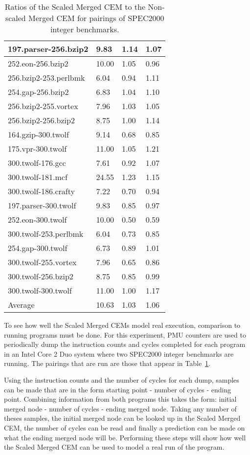 \begin{table}
\begin{tabular}{|l|l|l|l|}
197.parser-256.bzip2&9.83&1.14&1.07\\
\hline
252.eon-256.bzip2&10.00&1.05&0.96\\
\hline
256.bzip2-253.perlbmk&6.04&0.94&1.11\\
\hline
254.gap-256.bzip2&6.83&1.04&1.10\\
\hline
256.bzip2-255.vortex&7.96&1.03&1.05\\
\hline
256.bzip2-256.bzip2&8.75&1.00&1.14\\
\hline
164.gzip-300.twolf&9.14&0.68&0.85\\
\hline
175.vpr-300.twolf&11.00&1.05&1.21\\
\hline
300.twolf-176.gcc&7.61&0.92&1.07\\
\hline
300.twolf-181.mcf&24.55&1.23&1.15\\
\hline
300.twolf-186.crafty&7.22&0.70&0.94\\
\hline
197.parser-300.twolf&9.83&0.85&0.97\\
\hline
252.eon-300.twolf&10.00&0.50&0.59\\
\hline
300.twolf-253.perlbmk&6.04&0.73&0.85\\
\hline
254.gap-300.twolf&6.73&0.89&1.01\\
\hline
300.twolf-255.vortex&7.96&0.65&0.86\\
\hline
300.twolf-256.bzip2&8.75&0.85&0.99\\
\hline
300.twolf-300.twolf&11.00&1.00&1.17\\
\hline
\hline
Average&10.63&1.03&1.06\\
\hline
\end{tabular}
\caption{Ratios of the Scaled Merged CEM to the Non-scaled Merged CEM for pairings of SPEC2000
integer benchmarks.}
\label{table:scaled_graph_complexity}
\end{table}


To see how well the Scaled Merged CEMs model real execution,
comparison to running programs must be done. For this
experiment, PMU counters are used to periodically dump the
instruction counts and cycles completed for each program in an Intel Core 2 Duo
system where two SPEC2000 integer benchmarks are running.
The pairings that are run are those
that appear in Table~\ref{table:scaled_graph_complexity}.

Using the instruction counts and the number of cycles for each dump,
samples can be made that are in the form starting point - number of
cycles - ending point.  Combining information from both programs this
takes the form: initial merged node - number of cycles - ending merged
node. Taking any number of theses samples, the initial merged node can
be looked up in the Scaled Merged CEM, the number of cycles can be read and
finally a prediction can be made on what the ending merged node will
be. Performing these steps will show how well the Scaled Merged CEM
can be used to model a real run of the program.

